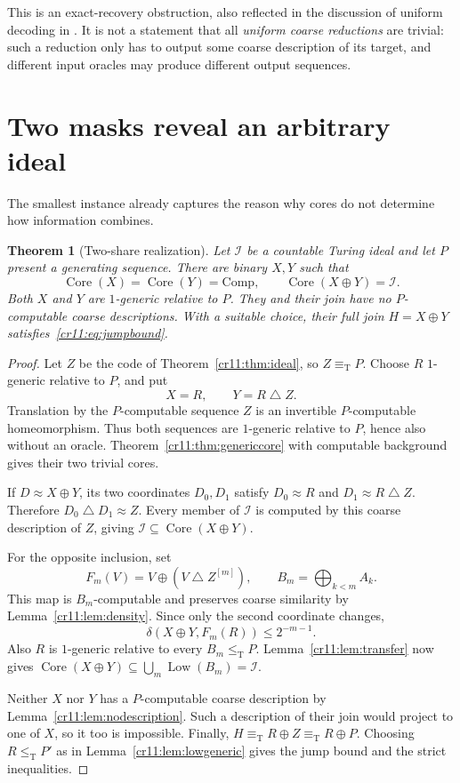 \documentclass[11pt,letterpaper]{article}
\theoremstyle{plain}
\newtheorem{theorem}{Theorem}[section]
\theoremstyle{definition}
\theoremstyle{remark}
\numberwithin{equation}{section}
\newcommand{\leT}{\leq_{\mathrm T}}
\newcommand{\eqT}{\equiv_{\mathrm T}}
\newcommand{\Core}{\operatorname{Core}}
\newcommand{\Low}{\operatorname{Low}}
\newcommand{\Comp}{\mathrm{Comp}}
\newcommand{\bitsum}{\mathbin{\triangle}}
\newcommand{\join}{\mathbin{\oplus}}
\newcommand{\I}{\mathcal I}
\begin{document}
This is an exact-recovery obstruction, also reflected in the discussion of
uniform decoding in \cite{HJKS}. It is not a statement that all
\emph{uniform coarse reductions} are trivial: such a reduction only has to
output some coarse description of its target, and different input
oracles may produce different output sequences.

\section{Two masks reveal an arbitrary ideal}\label{cr11:sec:two}

The smallest instance already captures the reason why cores do not determine
how information combines.

\begin{theorem}[Two-share realization]\label{cr11:thm:two}
Let $\I$ be a countable Turing ideal and let $P$ present a generating
sequence. There are binary $X,Y$ such that
\begin{equation}\label{cr11:eq:two}
 \Core(X)=\Core(Y)=\Comp,\qquad \Core(X\join Y)=\I.
\end{equation}
Both $X$ and $Y$ are $1$-generic relative to $P$. They and their join have
no $P$-computable coarse descriptions. With a suitable choice, their full
join $H=X\join Y$ satisfies~\eqref{cr11:eq:jumpbound}.
\end{theorem}
\begin{proof}
Let $Z$ be the code of Theorem~\ref{cr11:thm:ideal}, so $Z\eqT P$. Choose $R$
$1$-generic relative to $P$, and put
\[
                         X=R,\qquad Y=R\bitsum Z.
\]
Translation by the $P$-computable sequence $Z$ is an invertible
$P$-computable homeomorphism. Thus both sequences are $1$-generic relative
to $P$, hence also without an oracle. Theorem~\ref{cr11:thm:genericcore} with
computable background gives their two trivial cores.

If $D\approx X\join Y$, its two coordinates $D_0,D_1$ satisfy
$D_0\approx R$ and $D_1\approx R\bitsum Z$. Therefore
$D_0\bitsum D_1\approx Z$. Every member of $\I$ is computed by this
coarse description of $Z$, giving $\I\subseteq\Core(X\join Y)$.

For the opposite inclusion, set
\[
 F_m(V)=V\join(V\bitsum Z^{[m]}),\qquad
 B_m=\bigoplus_{k<m}A_k.
\]
This map is $B_m$-computable and preserves coarse similarity by
Lemma~\ref{cr11:lem:density}. Since only the second coordinate changes,
\[
 \delta(X\join Y,F_m(R))\leq 2^{-m-1}.
\]
Also $R$ is $1$-generic relative to every $B_m\leT P$.
Lemma~\ref{cr11:lem:transfer} now gives
$\Core(X\join Y)\subseteq\bigcup_m\Low(B_m)=\I$.

Neither $X$ nor $Y$ has a $P$-computable coarse description by
Lemma~\ref{cr11:lem:nodescription}. Such a description of their join would
project to one of $X$, so it too is impossible. Finally,
$H\eqT R\join Z\eqT R\join P$. Choosing $R\leT P'$ as in
Lemma~\ref{cr11:lem:lowgeneric} gives the jump bound and the strict inequalities.
\end{proof}
\end{document}
